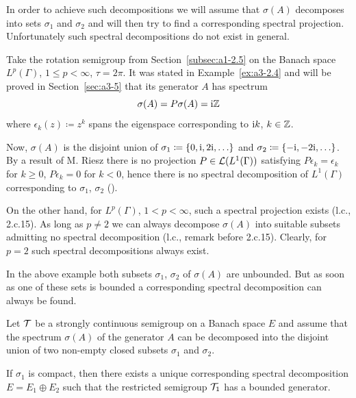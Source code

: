In order to achieve such decompositions we will assume that $\sigma(A)$ decomposes into sets $\sigma_{1}$ and $\sigma_{2}$ and will then try to find a corresponding spectral projection.
Unfortunately such spectral decompositions do not exist in general.
\begin{example}\label{ex:a3-3.2}
Take the rotation semigroup from Section~\ref{subsec:a1-2.5} on the Banach space $L^{p}(\Gamma)$, $1 \leq p < \infty$, $\tau = 2\pi$.
It was stated in Example~\ref{ex:a3-2.4} and will be proved in Section~\ref{sec:a3-5} that its generator $A$ has spectrum
\[
\sigma(A) = P\sigma(A) = \mathrm{i}\mathbb{Z}
\]
where $\epsilon_{k}(z) \coloneq z^{k}$ spans the eigenspace corresponding to $\mathrm{i} k$, $k \in \mathbb{Z}$.

Now, $\sigma(A)$ is the disjoint union of $\sigma_{1} \coloneq \{0,\mathrm{i} ,2\mathrm{i}, \ldots\}$ 
and $\sigma_{2} \coloneq \{-\mathrm{i}, -2\mathrm{i}, \ldots\}$.
By a result of M. Riesz there is no projection $P \in \mathcal{L}(L^{1}(\Gamma))$ satisfying $P\epsilon_{k} = \epsilon_{k}$ for $k \geq 0$, $P\epsilon_{k} = 0$ for $k < 0$, hence there is no spectral decomposition of\/ $L^{1}(\Gamma)$ corresponding to $\sigma_{1}$, $\sigma_{2}$ (\textcite[p.165]{lindenstraustzafriri:1979}).

On the other hand, for $L^{p}(\Gamma)$, $1 < p < \infty$, such a spectral projection exists (l.c., 2.c.15).
As long as $p \neq 2$ we can always decompose $\sigma(A)$ into suitable subsets admitting no spectral decomposition (l.c., remark before 2.c.15).
Clearly, for $p = 2$ such spectral decompositions always exist.
\end{example}
In the above example both subsets $\sigma_{1}$, $\sigma_{2}$ of\/ $\sigma(A)$ are unbounded.
But as soon as one of these sets is bounded a corresponding spectral decomposition can always be found.
\begin{theorem}\label{thm:a3-3.3}
Let $\mathcal{T}$ be a strongly continuous semigroup on a Banach space $E$ and assume that the spectrum $\sigma(A)$ of the generator $A$ can be decomposed into the disjoint union of two non-empty closed subsets $\sigma_{1}$ and 
$\sigma_{2}$.

If\/ $\sigma_{1}$ is compact, then there exists a unique corresponding spectral decomposition $E = E_{1} \oplus E_{2}$ such that the restricted semigroup $\mathcal{T}_{1}$ has a bounded generator.
\end{theorem}
